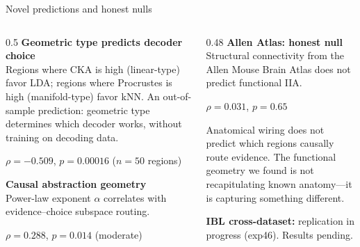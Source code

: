 \documentclass[aspectratio=169,11pt]{beamer}
\begin{document}
\begin{frame}{Novel predictions and honest nulls}
\begin{columns}[T]
\begin{column}{0.5\textwidth}
\textbf{Geometric type predicts decoder choice}\\[0.3em]
{\small Regions where CKA is high (linear-type) favor LDA; regions where Procrustes is high (manifold-type) favor kNN. An out-of-sample prediction: geometric type determines which decoder works, without training on decoding data.}

\vspace{0.3em}
\centering $\rho = -0.509$, $p = 0.00016$ {\small ($n = 50$ regions)}

\vspace{0.8em}
\textbf{Causal abstraction geometry}\\[0.3em]
{\small Power-law exponent $\alpha$ correlates with evidence--choice subspace routing.}

\vspace{0.3em}
\centering $\rho = 0.288$, $p = 0.014$ {\small (moderate)}
\end{column}
\begin{column}{0.48\textwidth}
\textbf{Allen Atlas: honest null}\\[0.3em]
{\small Structural connectivity from the Allen Mouse Brain Atlas does not predict functional IIA.}

\vspace{0.3em}
$\rho = 0.031$, $p = 0.65$

\vspace{0.5em}
{\small Anatomical wiring does not predict which regions causally route evidence. The functional geometry we found is not recapitulating known anatomy---it is capturing something different.}

\vspace{0.8em}
{\small \textbf{IBL cross-dataset:} replication in progress (exp46). Results pending.}
\end{column}
\end{columns}
\end{frame}

\end{document}
